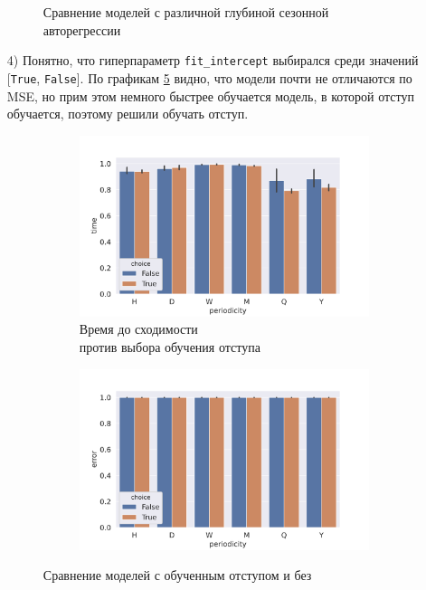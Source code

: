 \documentclass[a4paper,14pt]{extarticle}
\begin{document}
\begin{enumerate}
\begin{figure}[!h]
\begin{subfigure}[b]{.5\linewidth}
				\label{hyper:seas_depth:mse}
			\end{subfigure}
			\caption{Сравнение моделей с различной глубиной сезонной авторегрессии}
			\label{hyper:seas_depth}
		\end{figure}		
     	\item[4)] Понятно, что гиперпараметр \texttt{fit\_intercept} выбирался среди значений [\texttt{True}, \texttt{False}]. По графикам \ref{hyper:fit_intercept} видно, что модели почти не отличаются по MSE, но прим этом немного быстрее обучается модель, в которой отступ обучается, поэтому решили обучать отступ.
		\begin{figure}[!h]
			\captionsetup{justification=centering}
			\begin{subfigure}[b]{.5\linewidth}
				\centering
				\includegraphics[width=\linewidth]{pictures/hyper-fit_intercept-time.pdf}
				\caption{Время до сходимости \\ против выбора обучения отступа}
				\label{hyper:fit_intercept:time}
			\end{subfigure}%
			\begin{subfigure}[b]{.5\linewidth}
				\centering
				\includegraphics[width=\linewidth]{pictures/hyper-fit_intercept-mse.pdf}
				\label{hyper:fit_intercept:mse}
			\end{subfigure}
			\caption{Сравнение моделей с обученным отступом и без}
			\label{hyper:fit_intercept}
		\end{figure}
		

\end{enumerate}
\end{document}
